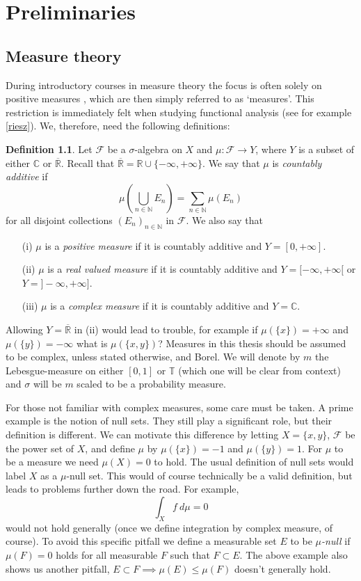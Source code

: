 \documentclass[a4paper,12pt,twoside,BCOR=10mm]{scrbook}
\theoremstyle{definition}
\theoremstyle{definition}
\theoremstyle{definition}
\newtheorem{definition}[theorem]{Definition}
\begin{document}
\chapter{Preliminaries}
\section{Measure theory}
During introductory courses in measure theory the focus is often solely on positive measures \citep{tao}, which are then simply referred to as `measures'.
This restriction is immediately felt when studying functional analysis (see for example \ref{riesz}).
We, therefore, need the following definitions:
\begin{definition}
\label{index1}
Let $\mathcal{F}$ be a $\sigma$-algebra on $X$ and $\mu: \mathcal{F} \rightarrow Y$, where $Y$ is a subset of either $\mathbb{C}$ or $\overline{\mathbb{R}}$.
Recall that $\overline{\mathbb{R}} = \mathbb{R} \cup \{-\infty, +\infty\}$.
We say that $\mu$ is \emph{countably additive} if
\[
	\mu\left( \bigcup_{n \in \mathbb{N}} E_n \right ) = \sum_{n \in \mathbb{N}} \mu(E_n)
\]
for all disjoint collections $(E_n)_{n \in \mathbb{N}}$ in $\mathcal{F}$.
We also say that
\begin{enumerate}
\item[(i)] $\mu$ is a \emph{positive measure} if it is countably additive and $Y = [0, +\infty]$.
\item[(ii)] $\mu$ is a \emph{real valued measure} if it is countably additive and $Y = [-\infty, +\infty[$ or $Y = ]-\infty, +\infty]$.
\item[(iii)] $\mu$ is a \emph{complex measure} if it is countably additive and $Y = \mathbb{C}$.
\end{enumerate}
\end{definition}
Allowing $Y = \overline{\mathbb{R}}$ in (ii) would lead to trouble, for example if $\mu(\{x\}) = +\infty$ and $\mu(\{y\}) = -\infty$ what is $\mu(\{x, y\})$?
Measures in this thesis should be assumed to be complex, unless stated otherwise, and Borel.
We will denote by $m$ the Lebesgue-measure on either $[0, 1]$ or $\mathbb{T}$ (which one will be clear from context) and $\sigma$ will be $m$ scaled to be a probability measure.

For those not familiar with complex measures, some care must be taken.
A prime example is the notion of null sets.
They still play a significant role, but their definition is different.
We can motivate this difference by letting $X = \{x, y\}$, $\mathcal{F}$ be the power set of $X$, and define $\mu$ by $\mu(\{x\}) = -1$ and $\mu(\{y\}) = 1$.
For $\mu$ to be a measure we need $\mu(X) = 0$ to hold.
The usual definition of null sets would label $X$ as a $\mu$-null set.
This would of course technically be a valid definition, but leads to problems further down the road.
For example,
\[
	\int_X f\ d\mu = 0
\]
would not hold generally (once we define integration by complex measure, of course).
To avoid this specific pitfall we define a measurable set $E$ to be \emph{$\mu$-null} if $\mu(F) = 0$ holds for all measurable $F$ such that $F \subset E$.
The above example also shows us another pitfall, $E \subset F \implies \mu(E) \leq \mu(F)$ doesn't generally hold.
\end{document}
